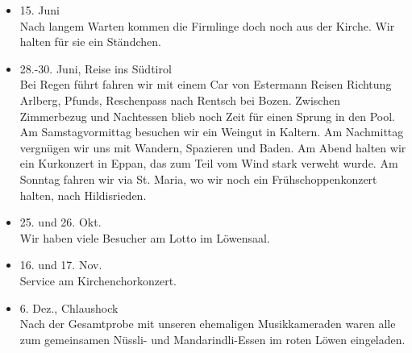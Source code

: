 \begin{history}
\begin{itemize}
        \item[]15. Juni\\
        Nach langem Warten kommen die Firmlinge doch noch aus der Kirche. Wir
        halten für sie ein Ständchen.

        \item[]28.-30. Juni, Reise ins Südtirol\\
        Bei Regen führt fahren wir mit einem Car von
        Estermann Reisen Richtung Arlberg, Pfunds, Reschenpass nach Rentsch bei
        Bozen. Zwischen Zimmerbezug und Nachtessen blieb noch Zeit für einen
        Sprung in den Pool. Am Samstagvormittag besuchen wir ein Weingut in
        Kaltern. Am Nachmittag vergnügen wir uns mit Wandern, Spazieren und
        Baden. Am Abend halten wir ein Kurkonzert in Eppan, das zum Teil vom
        Wind stark verweht wurde. Am Sonntag fahren wir via St. Maria, wo wir
        noch ein Frühschoppenkonzert halten, nach Hildisrieden.

        \item[]25. und 26. Okt.\\
        Wir haben viele Besucher am Lotto im Löwensaal.

        \item[]16. und 17. Nov.\\
        Service am Kirchenchorkonzert.

        \item[]6. Dez., Chlaushock\\
        Nach der Gesamtprobe mit unseren ehemaligen Musikkameraden
        waren alle zum gemeinsamen Nüssli- und Mandarindli-Essen im roten Löwen
        eingeladen.


    \end{itemize}

\end{history}
